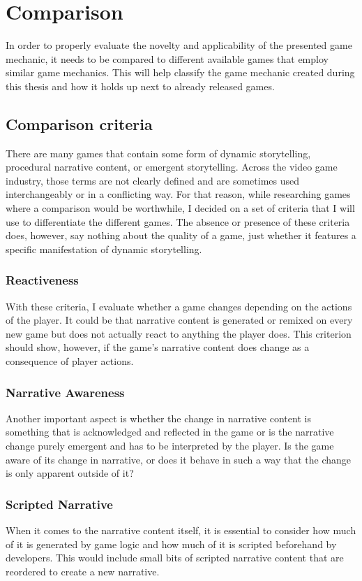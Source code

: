 \chapter{Comparison} %
In order to properly evaluate the novelty and applicability of the presented game mechanic, it needs to be compared to different available games that employ similar game mechanics. This will help classify the game mechanic created during this thesis and how it holds up next to already released games.
\section{Comparison criteria}
There are many games that contain some form of dynamic storytelling, procedural narrative content, or emergent storytelling. Across the video game industry, those terms are not clearly defined and are sometimes used interchangeably or in a conflicting way. For that reason, while researching games where a comparison would be worthwhile, I decided on a set of criteria that I will use to differentiate the different games. The absence or presence of these criteria does, however, say nothing about the quality of a game, just whether it features a specific manifestation of dynamic storytelling.
\subsection{Reactiveness}
With these criteria, I evaluate whether a game changes depending on the actions of the player. It could be that narrative content is generated or remixed on every new game but does not actually react to anything the player does. This criterion should show, however, if the game’s narrative content does change as a consequence of player actions.
\subsection{Narrative Awareness}
Another important aspect is whether the change in narrative content is something that is acknowledged and reflected in the game or is the narrative change purely emergent and has to be interpreted by the player. Is the game aware of its change in narrative, or does it behave in such a way that the change is only apparent outside of it?
\subsection{Scripted Narrative}
When it comes to the narrative content itself, it is essential to consider how much of it is generated by game logic and how much of it is scripted beforehand by developers. This would include small bits of scripted narrative content that are reordered to create a new narrative.
